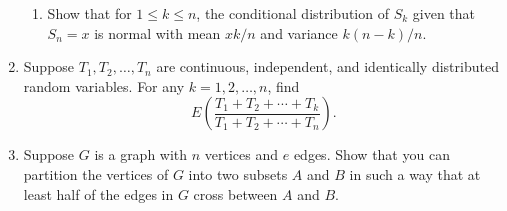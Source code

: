 \documentclass[11pt,letterpaper]{article}
\begin{document}
\begin{enumerate}
\begin{enumerate}
        \item Show that for $1\leq k\leq n$, the conditional distribution of $S_k$ given that $S_n = x$ is normal with mean $xk/n$ and variance $k(n-k)/n$.
    \end{enumerate}


    \item Suppose $T_1, T_2, \ldots, T_n$ are continuous, independent, and identically distributed random variables.
    For any $k = 1, 2, \ldots, n$, find
    \[
        E\left(\frac{T_1 + T_2 + \cdots + T_k}{T_1 + T_2 + \cdots + T_n}\right).
    \]

    \item Suppose $G$ is a graph with $n$ vertices and $e$ edges.
    Show that you can partition the vertices of $G$ into two subsets $A$ and $B$ in such a way that at least half of the edges in $G$ cross between $A$ and $B$.

\end{enumerate}
\end{document}
